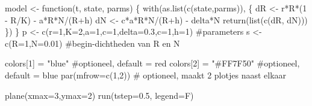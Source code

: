 \documentclass[
  a4paper,
]{scrbook}
\newenvironment{Shaded}{\begin{snugshade}}{\end{snugshade}}
\newcommand{\AttributeTok}[1]{\textcolor[rgb]{0.40,0.45,0.13}{#1}}
\newcommand{\CommentTok}[1]{\textcolor[rgb]{0.37,0.37,0.37}{#1}}
\newcommand{\ControlFlowTok}[1]{\textcolor[rgb]{0.00,0.23,0.31}{#1}}
\newcommand{\DecValTok}[1]{\textcolor[rgb]{0.68,0.00,0.00}{#1}}
\newcommand{\FloatTok}[1]{\textcolor[rgb]{0.68,0.00,0.00}{#1}}
\newcommand{\FunctionTok}[1]{\textcolor[rgb]{0.28,0.35,0.67}{#1}}
\newcommand{\NormalTok}[1]{\textcolor[rgb]{0.00,0.23,0.31}{#1}}
\newcommand{\OtherTok}[1]{\textcolor[rgb]{0.00,0.23,0.31}{#1}}
\newcommand{\SpecialCharTok}[1]{\textcolor[rgb]{0.37,0.37,0.37}{#1}}
\newcommand{\StringTok}[1]{\textcolor[rgb]{0.13,0.47,0.30}{#1}}
\theoremstyle{definition}
\theoremstyle{remark}
\begin{document}
\begin{Shaded}
\begin{Highlighting}[numbers=left,,]
\NormalTok{model }\OtherTok{\textless{}{-}} \ControlFlowTok{function}\NormalTok{(t, state, parms) \{}
  \FunctionTok{with}\NormalTok{(}\FunctionTok{as.list}\NormalTok{(}\FunctionTok{c}\NormalTok{(state,parms)), \{}
\NormalTok{    dR }\OtherTok{\textless{}{-}}\NormalTok{ r}\SpecialCharTok{*}\NormalTok{R}\SpecialCharTok{*}\NormalTok{(}\DecValTok{1} \SpecialCharTok{{-}}\NormalTok{ R}\SpecialCharTok{/}\NormalTok{K) }\SpecialCharTok{{-}}\NormalTok{ a}\SpecialCharTok{*}\NormalTok{R}\SpecialCharTok{*}\NormalTok{N}\SpecialCharTok{/}\NormalTok{(R}\SpecialCharTok{+}\NormalTok{h)}
\NormalTok{    dN }\OtherTok{\textless{}{-}}\NormalTok{ c}\SpecialCharTok{*}\NormalTok{a}\SpecialCharTok{*}\NormalTok{R}\SpecialCharTok{*}\NormalTok{N}\SpecialCharTok{/}\NormalTok{(R}\SpecialCharTok{+}\NormalTok{h) }\SpecialCharTok{{-}}\NormalTok{ delta}\SpecialCharTok{*}\NormalTok{N}
    \FunctionTok{return}\NormalTok{(}\FunctionTok{list}\NormalTok{(}\FunctionTok{c}\NormalTok{(dR, dN)))  }
\NormalTok{  \}) }
\NormalTok{\}  }
\NormalTok{p }\OtherTok{\textless{}{-}} \FunctionTok{c}\NormalTok{(}\AttributeTok{r=}\DecValTok{1}\NormalTok{,}\AttributeTok{K=}\DecValTok{2}\NormalTok{,}\AttributeTok{a=}\DecValTok{1}\NormalTok{,}\AttributeTok{c=}\DecValTok{1}\NormalTok{,}\AttributeTok{delta=}\FloatTok{0.3}\NormalTok{,}\AttributeTok{c=}\DecValTok{1}\NormalTok{,}\AttributeTok{h=}\DecValTok{1}\NormalTok{)  }\CommentTok{\#parameters}
\NormalTok{s }\OtherTok{\textless{}{-}} \FunctionTok{c}\NormalTok{(}\AttributeTok{R=}\DecValTok{1}\NormalTok{,}\AttributeTok{N=}\FloatTok{0.01}\NormalTok{) }\CommentTok{\#begin{-}dichtheden van R en N  }

\NormalTok{colors[}\DecValTok{1}\NormalTok{] }\OtherTok{=} \StringTok{"blue"} \CommentTok{\#optioneel, default = \textquotesingle{}red\textquotesingle{}}
\NormalTok{colors[}\DecValTok{2}\NormalTok{] }\OtherTok{=} \StringTok{"\#FF7F50"} \CommentTok{\#optioneel, default = \textquotesingle{}blue\textquotesingle{}}
\FunctionTok{par}\NormalTok{(}\AttributeTok{mfrow=}\FunctionTok{c}\NormalTok{(}\DecValTok{1}\NormalTok{,}\DecValTok{2}\NormalTok{)) }\CommentTok{\# optioneel, maakt 2 plotjes naast elkaar}

\FunctionTok{plane}\NormalTok{(}\AttributeTok{xmax=}\DecValTok{3}\NormalTok{,}\AttributeTok{ymax=}\DecValTok{2}\NormalTok{)}
\FunctionTok{run}\NormalTok{(}\AttributeTok{tstep=}\FloatTok{0.5}\NormalTok{, }\AttributeTok{legend=}\NormalTok{F)}
\end{Highlighting}
\end{Shaded}
\end{document}
